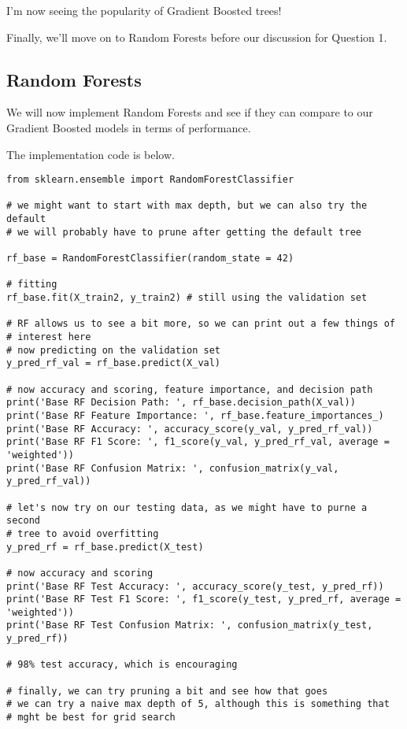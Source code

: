 \documentclass[12pt, letterpaper]{article}
\begin{document}
I'm now seeing the popularity of Gradient Boosted trees!

Finally, we'll move on to Random Forests before our discussion for Question 1. 

\subsection{Random Forests}

We will now implement Random Forests and see if they can compare to our Gradient Boosted models in terms of performance. 

The implementation code is below. 

\begin{verbatim}
from sklearn.ensemble import RandomForestClassifier 

# we might want to start with max depth, but we can also try the default 
# we will probably have to prune after getting the default tree 

rf_base = RandomForestClassifier(random_state = 42) 

# fitting 
rf_base.fit(X_train2, y_train2) # still using the validation set 

# RF allows us to see a bit more, so we can print out a few things of 
# interest here  
# now predicting on the validation set 
y_pred_rf_val = rf_base.predict(X_val) 

# now accuracy and scoring, feature importance, and decision path 
print('Base RF Decision Path: ', rf_base.decision_path(X_val))
print('Base RF Feature Importance: ', rf_base.feature_importances_) 
print('Base RF Accuracy: ', accuracy_score(y_val, y_pred_rf_val))
print('Base RF F1 Score: ', f1_score(y_val, y_pred_rf_val, average = 'weighted')) 
print('Base RF Confusion Matrix: ', confusion_matrix(y_val, y_pred_rf_val))
 
# let's now try on our testing data, as we might have to purne a second 
# tree to avoid overfitting 
y_pred_rf = rf_base.predict(X_test) 

# now accuracy and scoring 
print('Base RF Test Accuracy: ', accuracy_score(y_test, y_pred_rf)) 
print('Base RF Test F1 Score: ', f1_score(y_test, y_pred_rf, average = 'weighted')) 
print('Base RF Test Confusion Matrix: ', confusion_matrix(y_test, y_pred_rf))
 
# 98% test accuracy, which is encouraging 

# finally, we can try pruning a bit and see how that goes 
# we can try a naive max depth of 5, although this is something that 
# mght be best for grid search 
\end{verbatim}
\end{document}
